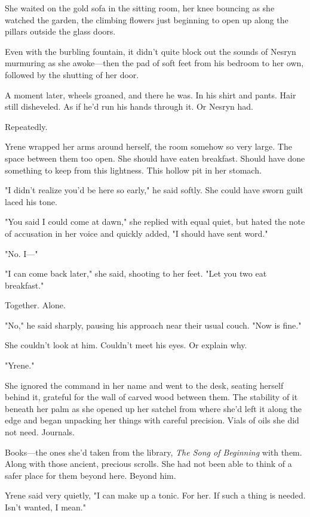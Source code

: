 She waited on the gold sofa in the sitting room, her knee bouncing as she watched the garden, the climbing flowers just beginning to open up along the pillars outside the glass doors.

Even with the burbling fountain, it didn't quite block out the sounds of Nesryn murmuring as she awoke---then the pad of soft feet from his bedroom to her own, followed by the shutting of her door.

A moment later, wheels groaned, and there he was.
In his shirt and pants.
Hair still disheveled.
As if he'd run his hands through it.
Or Nesryn had.

Repeatedly.

Yrene wrapped her arms around herself, the room somehow so very large.
The space between them too open.
She should have eaten breakfast.
Should have done something to keep from this lightness.
This hollow pit in her stomach.

"I didn't realize you'd be here so early," he said softly.
She could have sworn guilt laced his tone.

"You said I could come at dawn," she replied with equal quiet, but hated the note of accusation in her voice and quickly added, "I should have sent word."

"No.
I---"

"I can come back later," she said, shooting to her feet.
"Let you two eat breakfast."

Together.
Alone.

"No," he said sharply, pausing his approach near their usual couch.
"Now is fine."

She couldn't look at him.
Couldn't meet his eyes.
Or explain why.

"Yrene."

She ignored the command in her name and went to the desk, seating herself behind it, grateful for the wall of carved wood between them.
The stability of it beneath her palm as she opened up her satchel from where she'd left it along the edge and began unpacking her things with careful precision.
Vials of oils she did not need.
Journals.

Books---the ones she'd taken from the library, \emph{The Song of Beginning} with them.
Along with those ancient, precious scrolls.
She had not been able to think of a safer place for them beyond here.
Beyond him.

Yrene said very quietly, "I can make up a tonic.
For her.
If such a thing is needed.
Isn't wanted, I mean."

